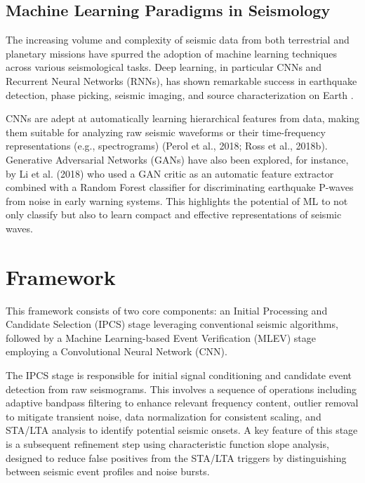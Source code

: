\documentclass[conference]{IEEEtran}
\begin{document}

    \subsection{ Machine Learning Paradigms in Seismology }
        The increasing volume and complexity of seismic data from both terrestrial and planetary missions have spurred the
        adoption of machine learning techniques across various seismological tasks. Deep learning, in particular CNNs and
        Recurrent Neural Networks (RNNs), has shown remarkable success in earthquake detection, phase picking, seismic
        imaging, and source characterization on Earth \cite{MousaviBeroza2022}.

        CNNs are adept at automatically learning hierarchical features from data, making them suitable for analyzing raw
        seismic waveforms or their time-frequency representations (e.g., spectrograms) (Perol et al., 2018; Ross et al.,
        2018b). Generative Adversarial Networks (GANs) have also been explored, for instance, by Li et al. (2018) who
        used a GAN critic as an automatic feature extractor combined with a Random Forest classifier for discriminating
        earthquake P-waves from noise in early warning systems. This highlights the potential of ML to not only classify
        but also to learn compact and effective representations of seismic waves.


\section{Framework}
This framework consists of two core components: an Initial Processing and Candidate
Selection (IPCS) stage leveraging conventional seismic algorithms, followed by a Machine Learning-based Event
Verification (MLEV) stage employing a Convolutional Neural Network (CNN).

The IPCS stage is responsible for initial signal conditioning and candidate event detection from raw seismograms. This
involves a sequence of operations including adaptive bandpass filtering to enhance relevant frequency content, outlier
removal to mitigate transient noise, data normalization for consistent scaling, and STA/LTA analysis to identify
potential seismic onsets. A key feature of this stage is a subsequent refinement step using characteristic function
slope analysis, designed to reduce false positives from the STA/LTA triggers by distinguishing between seismic event
profiles and noise bursts.
\end{document}
